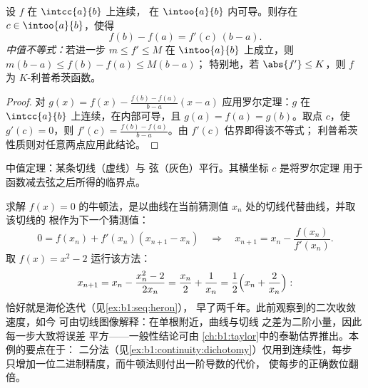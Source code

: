 \begin{theorem}[中值定理]\label{thm:b1:derivative:mvt}
设 $f$ 在 $\intcc{a}{b}$ 上连续，
在 $\intoo{a}{b}$ 内可导。则存在 $c \in \intoo{a}{b}$，使得
\[
f(b) - f(a) = f'(c)\,(b - a) .
\]
\emph{中值不等式：}若进一步 $m \leq f' \leq M$ 在
$\intoo{a}{b}$ 上成立，则 $m(b-a) \leq f(b) - f(a) \leq M(b-a)$；
特别地，若 $\abs{f'} \leq K$，则 $f$ 为 $K$-利普希茨函数。
\end{theorem}

\begin{proof}
对 $g(x) = f(x) - \frac{f(b) - f(a)}{b - a}(x - a)$ 应用罗尔定理：$g$
在 $\intcc{a}{b}$ 上连续，在内部可导，且 $g(a) =
f(a) = g(b)$。取点 $c$，使 $g'(c) = 0$，则 $f'(c) =
\frac{f(b)-f(a)}{b-a}$。由 $f'(c)$ 估界即得该不等式；
利普希茨性质则对任意两点应用此结论。
\end{proof}

\begin{omfigure}

{\small 中值定理：某条切线（虚线）与
弦（灰色）平行。其横坐标 $c$ 是将罗尔定理
用于函数减去弦之后所得的临界点。}
\end{omfigure}

\begin{example}[牛顿法即海伦迭代]\label{ex:b1:derivative:newton}
求解 $f(x) = 0$ 的牛顿法，是以曲线在当前猜测值
$x_n$ 处的切线代替曲线，并取该切线的
根作为下一个猜测值：
\[
0 = f(x_n) + f'(x_n)(x_{n+1} - x_n)
\quad\Longrightarrow\quad
x_{n+1} = x_n - \frac{f(x_n)}{f'(x_n)} .
\]
取 $f(x) = x^2 - 2$ 运行该方法：
\[
x_{n+1} = x_n - \frac{x_n^2 - 2}{2x_n}
= \frac{x_n}{2} + \frac{1}{x_n}
= \frac12\Bigl(x_n + \frac{2}{x_n}\Bigr) :
\]
恰好就是海伦迭代（见\cref{ex:b1:seq:heron}），
早了两千年。此前观察到的二次收敛速度，如今
可由切线图像解释：在单根附近，曲线与切线
之差为二阶小量，因此每一步大致将误差
平方——一般性结论可由
\cref{ch:b1:taylor}中的泰勒估界推出。本例的要点在于：
二分法（见\cref{ex:b1:continuity:dichotomy}）仅用到连续性，每步
只增加一位二进制精度，而牛顿法则付出一阶导数的代价，
使每步的正确数位翻倍。
\end{example}

